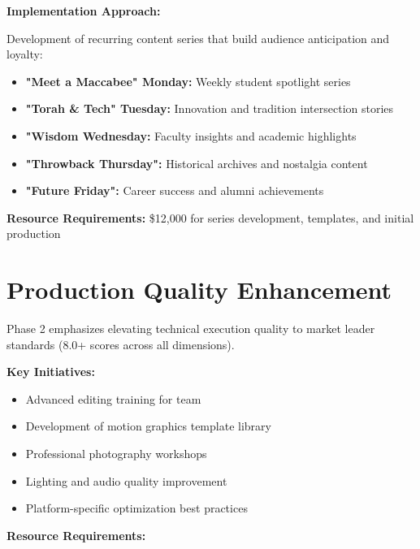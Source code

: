 \documentclass[12pt]{report}
\begin{document}
\textbf{Implementation Approach:}

Development of recurring content series that build audience anticipation and loyalty:

\begin{itemize}
\item \textbf{"Meet a Maccabee" Monday:} Weekly student spotlight series
\item \textbf{"Torah \& Tech" Tuesday:} Innovation and tradition intersection stories
\item \textbf{"Wisdom Wednesday:} Faculty insights and academic highlights
\item \textbf{"Throwback Thursday":} Historical archives and nostalgia content
\item \textbf{"Future Friday":} Career success and alumni achievements
\end{itemize}

\textbf{Resource Requirements:} \$12,000 for series development, templates, and initial production

\section{Production Quality Enhancement}

Phase 2 emphasizes elevating technical execution quality to market leader standards (8.0+ scores across all dimensions).

\textbf{Key Initiatives:}

\begin{itemize}
\item Advanced editing training for team
\item Development of motion graphics template library
\item Professional photography workshops
\item Lighting and audio quality improvement
\item Platform-specific optimization best practices
\end{itemize}

\textbf{Resource Requirements:}
\end{document}
